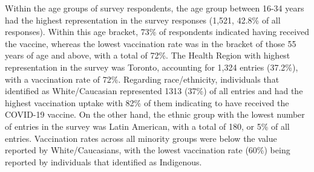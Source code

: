 \documentclass[
  letterpaper,
  DIV=11,
  numbers=noendperiod]{scrartcl}
\begin{document}
Within the age groups of survey respondents, the age group between 16-34
years had the highest representation in the survey responses (1,521,
42.8\% of all responses). Within this age bracket, 73\% of respondents
indicated having received the vaccine, whereas the lowest vaccination
rate was in the bracket of those 55 years of age and above, with a total
of 72\%. The Health Region with highest representation in the survey was
Toronto, accounting for 1,324 entries (37.2\%), with a vaccination rate
of 72\%. Regarding race/ethnicity, individuals that identified as
White/Caucasian represented 1313 (37\%) of all entries and had the
highest vaccination uptake with 82\% of them indicating to have received
the COVID-19 vaccine. On the other hand, the ethnic group with the
lowest number of entries in the survey was Latin American, with a total
of 180, or 5\% of all entries. Vaccination rates across all minority
groups were below the value reported by White/Caucasians, with the
lowest vaccination rate (60\%) being reported by individuals that
identified as Indigenous.
\end{document}
